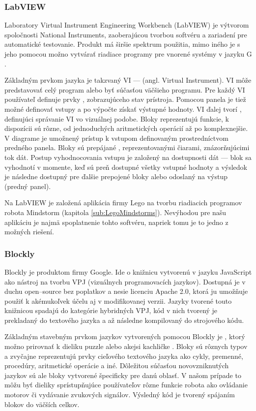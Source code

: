 \subsubsection{LabVIEW}
Laboratory Virtual Instrument Engineering Workbench (LabVIEW) je výtvorom spoločnosti National Instruments, zaoberajúcou tvorbou softvéru a zariadení pre automatické testovanie. Produkt má širšie spektrum použitia, mimo iného je s jeho pomocou možno vytvárať riadiace programy pre vnorené systémy v jazyku G \cite{LabVIEW}.

Základným prvkom jazyka je takzvaný VI ---  (angl. Virtual Instrument). VI môže predstavovať celý program alebo byť súčasťou väčšieho programu. Pre každý VI používateľ definuje prvky , zobrazujúceho stav prístroja. Pomocou panela je tiež možné definovať vstupy a po výpočte získať výstupné hodnoty. VI ďalej tvorí , definujúci správanie VI vo vizuálnej podobe. Bloky reprezentujú funkcie, k dispozícii sú rôzne, od jednoduchých aritmetických operácií až po komplexnejšie. V diagrame je umožnený prístup k vstupom definovaným prostredníctvom predného panela. Bloky sú prepájané , reprezentovanými čiarami, znázorňujúcimi tok dát. Postup vyhodnocovania vstupu je založený na dostupnosti dát --- blok sa vyhodnotí v momente, keď sú preň dostupné všetky vstupné hodnoty a výsledok je následne dostupný pre ďalšie prepojené bloky alebo odoslaný na výstup (predný panel).

Na LabVIEW je založená aplikácia firmy Lego na tvorbu riadiacich programov robota Mindstorm (kapitola \ref{sub:LegoMindstorms}). Nevýhodou pre našu aplikáciu je najmä spoplatnenie tohto softvéru, napriek tomu je to jedno z možných riešení.

\subsubsection{Blockly}
Blockly je produktom firmy Google. Ide o knižnicu vytvorenú v jazyku JavaScript ako nástroj na tvorbu VPJ (vizuálnych programovacích jazykov). Dostupná je v duchu open--source bez poplatkov a nesie licenciu Apache 2.0, ktorá ju umožňuje použiť k akémukoľvek účelu aj v modifikovanej verzii. Jazyky tvorené touto knižnicou spadajú do kategórie hybridných VPJ, kód v nich tvorený je prekladaný do textového jazyka a až následne kompilovaný do strojového kódu.

Základným stavebným prvkom jazykov vytvorených pomocou Blockly je , ktorý možno prirovnať k dieliku puzzle alebo akejsi kachličke \cite{pasternak2017tips}. Bloky sú rôznych typov a zvyčajne reprezentujú prvky cieľového textového jazyka ako cykly, premenné, procedúry, aritmetické operácie a iné. Dôležitou súčasťou novovzniknutých jazykov sú ale bloky vytvorené špecificky pre danú oblasť. V našom prípade to môžu byť dieliky sprístupňujúce používateľov rôzne funkcie robota ako ovládanie motorov či vydávanie zvukových signálov. Výsledný kód je tvorený spájaním blokov do väčších celkov.

